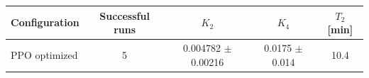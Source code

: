 \begin{tabular}{lcccc}
\toprule
Configuration & Successful runs & $K_2$ & $K_4$ & $T_2$ [min] \\
\midrule
PPO optimized & 5 & 0.004782 $\pm$ 0.00216 & 0.0175 $\pm$ 0.014 & 10.4 \\
\bottomrule
\end{tabular}
